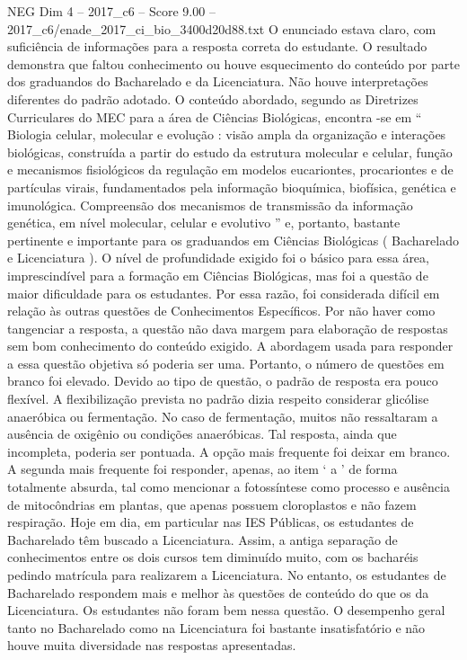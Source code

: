 \begin{textsample}{NEG Dim 4 – 2017\_c6 – Score 9.00 – 2017\_c6/enade\_2017\_ci\_bio\_3400d20d88.txt}
O enunciado estava claro, com suficiência de informações para a resposta correta do estudante.
O resultado demonstra que faltou conhecimento ou houve esquecimento do conteúdo por parte dos graduandos do Bacharelado e da Licenciatura.
Não houve interpretações diferentes do padrão adotado.
O conteúdo abordado, segundo as Diretrizes Curriculares do MEC para a área de Ciências Biológicas, encontra -se em “ Biologia celular, molecular e evolução : visão ampla da organização e interações biológicas, construída a partir do estudo da estrutura molecular e celular, função e mecanismos fisiológicos da regulação em modelos eucariontes, procariontes e de partículas virais, fundamentados pela informação bioquímica, biofísica, genética e imunológica.
Compreensão dos mecanismos de transmissão da informação genética, em nível molecular, celular e evolutivo ” e, portanto, bastante pertinente e importante para os graduandos em Ciências Biológicas ( Bacharelado e Licenciatura ).
O nível de profundidade exigido foi o básico para essa área, imprescindível para a formação em Ciências Biológicas, mas foi a questão de maior dificuldade para os estudantes.
Por essa razão, foi considerada difícil em relação às outras questões de Conhecimentos Específicos.
Por não haver como tangenciar a resposta, a questão não dava margem para elaboração de respostas sem bom conhecimento do conteúdo exigido.
A abordagem usada para responder a essa questão objetiva só poderia ser uma.
Portanto, o número de questões em branco foi elevado.
Devido ao tipo de questão, o padrão de resposta era pouco flexível.
A flexibilização prevista no padrão dizia respeito considerar glicólise anaeróbica ou fermentação.
No caso de fermentação, muitos não ressaltaram a ausência de oxigênio ou condições anaeróbicas.
Tal resposta, ainda que incompleta, poderia ser pontuada.
A opção mais frequente foi deixar em branco.
A segunda mais frequente foi responder, apenas, ao item ‘ a ’ de forma totalmente absurda, tal como mencionar a fotossíntese como processo e ausência de mitocôndrias em plantas, que apenas possuem cloroplastos e não fazem respiração.
Hoje em dia, em particular nas IES Públicas, os estudantes de Bacharelado têm buscado a Licenciatura.
Assim, a antiga separação de conhecimentos entre os dois cursos tem diminuído muito, com os bacharéis pedindo matrícula para realizarem a Licenciatura.
No entanto, os estudantes de Bacharelado respondem mais e melhor às questões de conteúdo do que os da Licenciatura.
Os estudantes não foram bem nessa questão.
O desempenho geral tanto no Bacharelado como na Licenciatura foi bastante insatisfatório e não houve muita diversidade nas respostas apresentadas.

\end{textsample}
